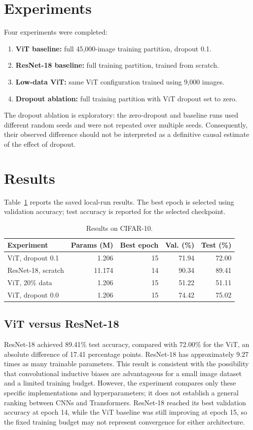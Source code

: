 \documentclass[conference]{IEEEtran}
\begin{document}
\section{Experiments}
Four experiments were completed:
\begin{enumerate}
\item \textbf{ViT baseline:} full 45,000-image training partition, dropout 0.1.
\item \textbf{ResNet-18 baseline:} full training partition, trained from scratch.
\item \textbf{Low-data ViT:} same ViT configuration trained using 9,000 images.
\item \textbf{Dropout ablation:} full training partition with ViT dropout set to zero.
\end{enumerate}
The dropout ablation is exploratory: the zero-dropout and baseline runs used different random seeds and were not repeated over multiple seeds. Consequently, their observed difference should not be interpreted as a definitive causal estimate of the effect of dropout.

\section{Results}
Table~\ref{tab:results} reports the saved local-run results. The best epoch is selected using validation accuracy; test accuracy is reported for the selected checkpoint.

\begin{table}[t]
\centering
\caption{Results on CIFAR-10.}
\label{tab:results}
\small
\begin{tabular}{lrrrr}
\toprule
Experiment & Params (M) & Best epoch & Val. (\%) & Test (\%)\\
\midrule
ViT, dropout 0.1 & 1.206 & 15 & 71.94 & 72.00\\
ResNet-18, scratch & 11.174 & 14 & 90.34 & 89.41\\
ViT, 20\% data & 1.206 & 15 & 51.22 & 51.11\\
ViT, dropout 0.0 & 1.206 & 15 & 74.42 & 75.02\\
\bottomrule
\end{tabular}
\end{table}

\subsection{ViT versus ResNet-18}
ResNet-18 achieved 89.41\% test accuracy, compared with 72.00\% for the ViT, an absolute difference of 17.41 percentage points. ResNet-18 has approximately 9.27 times as many trainable parameters. This result is consistent with the possibility that convolutional inductive biases are advantageous for a small image dataset and a limited training budget. However, the experiment compares only these specific implementations and hyperparameters; it does not establish a general ranking between CNNs and Transformers. ResNet-18 reached its best validation accuracy at epoch 14, while the ViT baseline was still improving at epoch 15, so the fixed training budget may not represent convergence for either architecture.
\end{document}
